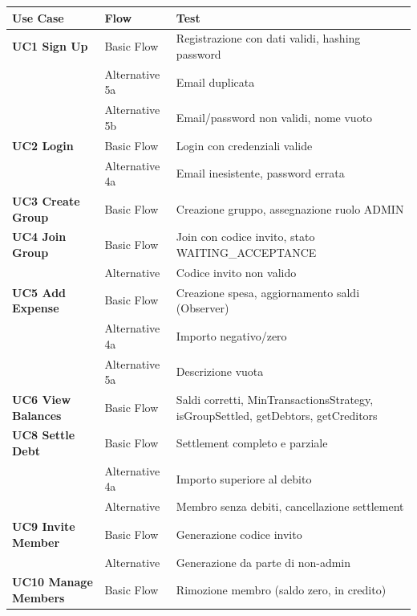 \begin{table}[H]
    \centering
    \footnotesize
    \renewcommand{\arraystretch}{1.2} %
    \begin{tabularx}{\textwidth}{@{} l l X @{}}
        \toprule
        \textbf{Use Case} & \textbf{Flow} & \textbf{Test} \\
        \midrule
        \textbf{UC1 Sign Up} & Basic Flow & Registrazione con dati validi, hashing password \\
        & Alternative 5a & Email duplicata \\
        & Alternative 5b & Email/password non validi, nome vuoto \\
        \midrule
        \textbf{UC2 Login} & Basic Flow & Login con credenziali valide \\
        & Alternative 4a & Email inesistente, password errata \\
        \midrule
        \textbf{UC3 Create Group} & Basic Flow & Creazione gruppo, assegnazione ruolo ADMIN \\
        \midrule
        \textbf{UC4 Join Group} & Basic Flow & Join con codice invito, stato WAITING\_ACCEPTANCE \\
        & Alternative & Codice invito non valido \\
        \midrule
        \textbf{UC5 Add Expense} & Basic Flow & Creazione spesa, aggiornamento saldi (Observer) \\
        & Alternative 4a & Importo negativo/zero \\
        & Alternative 5a & Descrizione vuota \\
        \midrule
        \textbf{UC6 View Balances} & Basic Flow & Saldi corretti, MinTransactionsStrategy, isGroupSettled, getDebtors, getCreditors \\
        \midrule
        \textbf{UC8 Settle Debt} & Basic Flow & Settlement completo e parziale \\
        & Alternative 4a & Importo superiore al debito \\
        & Alternative & Membro senza debiti, cancellazione settlement \\
        \midrule
        \textbf{UC9 Invite Member} & Basic Flow & Generazione codice invito \\
        & Alternative & Generazione da parte di non-admin \\
        \midrule
        \textbf{UC10 Manage Members} & Basic Flow & Rimozione membro (saldo zero, in credito) \\

\end{tabularx}
\end{table}
